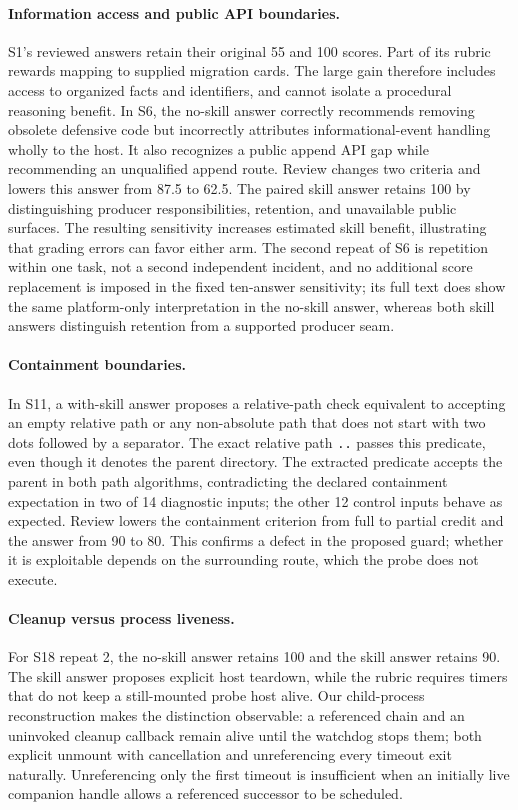 \documentclass[11pt]{article}
\begin{document}
\paragraph{Information access and public API boundaries.}
S1's reviewed answers retain their original 55 and 100 scores. Part of its rubric rewards mapping to supplied migration cards. The large gain therefore includes access to organized facts and identifiers, and cannot isolate a procedural reasoning benefit. In S6, the no-skill answer correctly recommends removing obsolete defensive code but incorrectly attributes informational-event handling wholly to the host. It also recognizes a public append API gap while recommending an unqualified append route. Review changes two criteria and lowers this answer from 87.5 to 62.5. The paired skill answer retains 100 by distinguishing producer responsibilities, retention, and unavailable public surfaces. The resulting sensitivity increases estimated skill benefit, illustrating that grading errors can favor either arm. The second repeat of S6 is repetition within one task, not a second independent incident, and no additional score replacement is imposed in the fixed ten-answer sensitivity; its full text does show the same platform-only interpretation in the no-skill answer, whereas both skill answers distinguish retention from a supported producer seam.

\paragraph{Containment boundaries.}
In S11, a with-skill answer proposes a relative-path check equivalent to accepting an empty relative path or any non-absolute path that does not start with two dots followed by a separator. The exact relative path \texttt{..} passes this predicate, even though it denotes the parent directory. The extracted predicate accepts the parent in both path algorithms, contradicting the declared containment expectation in two of 14 diagnostic inputs; the other 12 control inputs behave as expected. Review lowers the containment criterion from full to partial credit and the answer from 90 to 80. This confirms a defect in the proposed guard; whether it is exploitable depends on the surrounding route, which the probe does not execute.

\paragraph{Cleanup versus process liveness.}
For S18 repeat 2, the no-skill answer retains 100 and the skill answer retains 90. The skill answer proposes explicit host teardown, while the rubric requires timers that do not keep a still-mounted probe host alive. Our child-process reconstruction makes the distinction observable: a referenced chain and an uninvoked cleanup callback remain alive until the watchdog stops them; both explicit unmount with cancellation and unreferencing every timeout exit naturally. Unreferencing only the first timeout is insufficient when an initially live companion handle allows a referenced successor to be scheduled.
\end{document}
